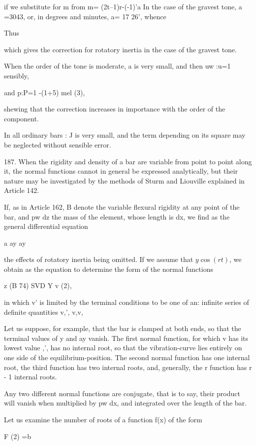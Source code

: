 if we substitute for m from m= (2t--1)r-(-1)'a In the case of the
gravest tone, a =3043, or, in degrees and minutes, a= 17 26', whence

Thus

which gives the correction for rotatory inertia in the case of the
gravest tone.

When the order of the tone is moderate, a is very small, and then uw
:u=1 sensibly,

and p:P=1 -(1+5) mel (3),

shewing that the correction increases in importance with the order of
the component.

In all ordinary bars : J is very small, and the term depending on its
square may be neglected without sensible error.

187. When the rigidity and density of a bar are variable from point to
point along it, the normal functions cannot in general be expressed
analytically, but their nature may be investigated by the methods of
Sturm and Liouville explained in Article 142.

If, as in Article 162, B denote the variable flexural rigidity at any
point of the bar, and pw dz the mass of the element, whose length is dx,
we find as the general differential equation

a ay ay

the effects of rotatory inertia being omitted. If we assume that
\(y  \cos(rt)\), we obtain as the equation to determine the form of the
normal functions

z (B 74) SVD Y v (2),

in which v' is limited by the terminal conditions to be one of an:
infinite series of definite quantities v,', v,v,

Let us suppose, for example, that the bar is clamped at both ends, so
that the terminal values of y and ay vanish. The first normal function,
for which v has its lowest value ,', has no internal root, so that the
vibration-curve lies entirely on one side of the equilibrium-position.
The second normal function has one internal root, the third function has
two internal roots, and, generally, the r function has r - 1 internal
roots.

Any two different normal functions are conjugate, that is to say, their
product will vanish when multiplied by pw dx, and integrated over the
length of the bar.

Let us examine the number of roots of a function f(x) of the form

F (2) =b

